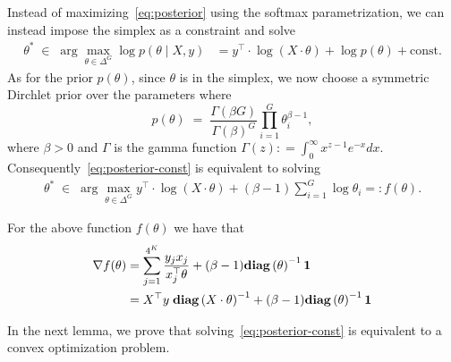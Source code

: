 \documentclass[11pt]{article}
\newcommand{\diag}[1]{\mathbf{diag}\left( #1\right)}
\newcommand{\ones}{{\bf 1}}
\begin{document}
Instead of maximizing~\eqref{eq:posterior} using the softmax parametrization, we can instead impose the simplex as a constraint and solve
\begin{align}
\theta^* \; \in \; \arg \max_{\theta \in \Delta^G}  \log p(\theta \mid X, y) &= y^{\top} \cdot \log \left( X \cdot \theta \right)
         +\log p(\theta)+\textrm{const.} \label{eq:posterior-const}
\end{align} 
As for the prior $p(\theta)$, since $\theta$ is in the simplex, we now choose a symmetric Dirchlet  prior over the parameters where
\begin{equation}
p(\theta) \; = \; \frac{\Gamma(\beta G)}{\Gamma(\beta)^G} \prod_{i=1}^G \theta_i^{\beta -1}, 
\end{equation}
where $\beta>0$ and $\Gamma$ is the gamma function $\Gamma(z) : = \int_{0}^{\infty} x^{z-1}e^{-x}dx.$
Consequently~\eqref{eq:posterior-const} is equivalent to solving
 \begin{align}
\theta^* \; \in \; \arg \max_{\theta \in \Delta^G}   y^{\top} \cdot \log \left( X \cdot \theta \right)
         +(\beta-1)\sum_{i=1}^G\log\theta_i =: f(\theta). \label{eq:posterior-const2}
\end{align} 



For the above function $f(\theta)$ we have that
\begin{align}
\nabla f(\theta) &= \sum_{j=1}^{4^K} \frac{y_j x_j}{x_j^\top \theta} + (\beta-1 ) \diag{\theta}^{-1} \ones\\
&= X^\top y \;\diag{X  \cdot\theta}^{-1}+ (\beta-1 ) \diag{\theta}^{-1} \ones
\end{align}


In the next lemma,  we prove that solving~\eqref{eq:posterior-const} is equivalent to a convex optimization problem.
\end{document}

